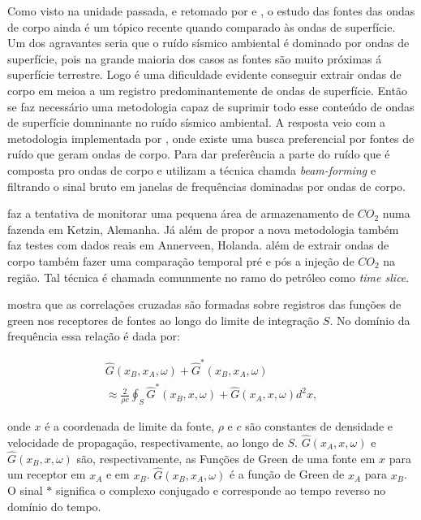\documentclass[paper,twocolumn]{geophysics}
\begin{document}
Como visto na unidade passada, e retomado por \cite{vidal_retrieval_2014} e \cite{boullenger_studying_2015}, o estudo das fontes das ondas de corpo ainda é um tópico recente quando comparado às ondas de superfície. Um dos agravantes seria que o ruído sísmico ambiental é dominado por ondas de superfície, pois na grande maioria dos casos as fontes são muito próximas á superfície terrestre. Logo é uma dificuldade evidente conseguir extrair ondas de corpo em meioa a um registro predominantemente de ondas de superfície. Então se faz necessário uma metodologia capaz de suprimir todo esse conteúdo de ondas de superfície domninante no ruído sísmico ambiental. A resposta veio com a metodologia implementada por \cite{vidal_retrieval_2014}, onde existe uma busca preferencial por fontes de ruído que geram ondas de corpo. Para dar preferência a parte do ruído que é composta pro ondas de corpo \cite{vidal_retrieval_2014} e \cite{boullenger_studying_2015} utilizam a técnica chamda \textit{beam-forming} e filtrando o sinal bruto em janelas de frequências dominadas por ondas de corpo. 

\cite{boullenger_studying_2015} faz a tentativa de monitorar uma pequena área de armazenamento de $CO_{2}$ numa fazenda em Ketzin, Alemanha. Já \cite{vidal_retrieval_2014} além de propor a nova metodologia também faz testes com dados reais em Annerveen, Holanda. \cite{boullenger_studying_2015} além de extrair ondas de corpo também fazer uma comparação temporal pré e pós a injeção de $CO_{2}$ na região. Tal técnica é chamada comunmente no ramo do petróleo como \textit{time slice}.

\cite{boullenger_studying_2015} mostra que as correlações cruzadas são formadas sobre registros das funções de green nos receptores de fontes ao longo do limite de integração $S$. No domínio da frequência essa relação é dada por:

\begin{align*}
\hat{G}(x_{B}, x_{A}, \omega) + \hat{G}^{\ast}(x_{B}, x_{A}, \omega) \\  
\approx \frac{2}{\rho c} \oint_{S} \hat{G}^{\ast}(x_{B}, x, \omega) + \hat{G}(x_{A}, x, \omega) d^{2}x,
\end{align*}

onde $x$ é a coordenada de limite da fonte, $\rho$ e $c$ são constantes de densidade e velocidade de propagação, respectivamente, ao longo de $S$. $\hat{G}(x_{A}, x, \omega)$ e $\hat{G}(x_{B}, x, \omega)$ são, respectivamente, as Funções de Green de uma fonte em $x$ para um receptor em $x_{A}$ e em $x_{B}$. $\hat{G}(x_{B}, x_{A}, \omega)$ é a função de Green de $x_{A}$ para $x_{B}$. O sinal $\ast$ significa o complexo conjugado e corresponde ao tempo reverso no domínio do tempo.
\end{document}
